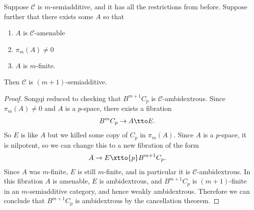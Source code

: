 \begin{lemma} Suppose $\mathscr{C}$ is $m$-semiadditive, and it has all the restrictions from before. Suppose further that there exists some $A$ so that
\begin{enumerate}
    \item $A$ is $\mathscr{C}$-amenable
    \item $\pi_m(A) \ne 0$
    \item $A$ is $m$-finite.
\end{enumerate}
Then $\mathscr{C}$ is $(m+1)$-semiadditive.
\end{lemma}
\begin{proof} Songqi reduced to checking that $B^{m+1}C_p$ is $\mathscr{C}$-ambidextrous. Since $\pi_m(A) \ne 0$ and $A$ is a $p$-space, there exists a fibration
\begin{align*}
    B^m C_p \to A \tto E.
\end{align*}
So $E$ is like $A$ but we killed some copy of $C_p$ in $\pi_m(A)$. Since $A$ is a $p$-space, it is nilpotent, so we can change this to a new fibration of the form
\begin{align*}
    A \to E \xtto{p} B^{m+1}C_p.
\end{align*}
Since $A$ was $m$-finite, $E$ is still $m$-finite, and in particular it is $\mathscr{C}$-ambidextrous. In this fibration $A$ is amenable, $E$ is ambidextrous, and $B^{m+1}C_p$ is $(m+1)$-finite in an $m$-semiadditive category, and hence weakly ambidextrous. Therefore we can conclude that $B^{m+1} C_p$ is ambidextrous by the cancellation theorem. 
\end{proof}

